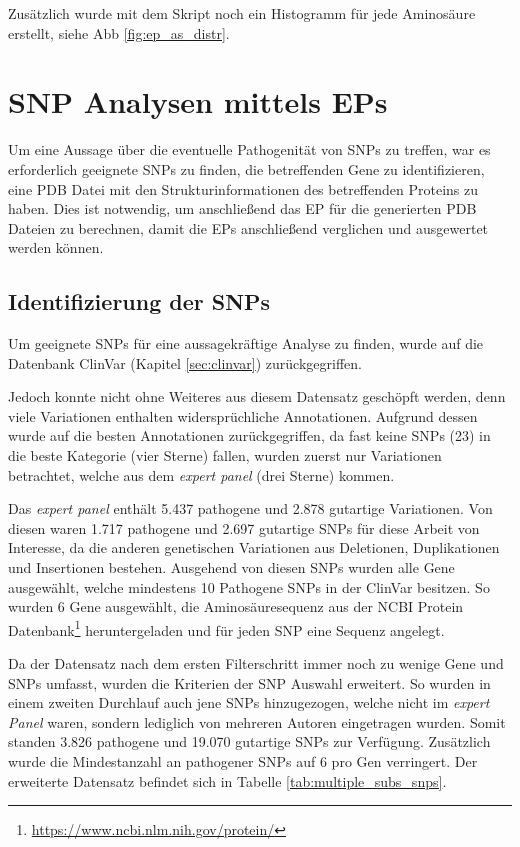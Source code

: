 Zusätzlich wurde mit dem Skript noch ein Histogramm für jede Aminosäure erstellt, siehe \ac{Abb} \ref{fig:ep_as_distr}.



\section{SNP Analysen mittels EPs}
\label{sec:snp_analyse}

Um eine Aussage über die eventuelle Pathogenität von \ac{SNP}s zu treffen, war es erforderlich geeignete \ac{SNP}s zu finden, die betreffenden Gene zu identifizieren, eine \ac{PDB} Datei mit den Strukturinformationen des betreffenden Proteins zu haben. Dies ist notwendig, um anschließend das \ac{EP} für die generierten \ac{PDB} Dateien zu berechnen, damit die \ac{EP}s anschließend verglichen und ausgewertet werden können.


\subsection{Identifizierung der SNPs}
\label{sec:clinvar_filter}
Um geeignete \ac{SNP}s für eine aussagekräftige Analyse zu finden, wurde auf die Datenbank ClinVar (Kapitel \ref{sec:clinvar}) zurückgegriffen.

Jedoch konnte nicht ohne Weiteres aus diesem Datensatz geschöpft werden, denn viele Variationen enthalten widersprüchliche Annotationen. Aufgrund dessen wurde auf die besten Annotationen zurückgegriffen, da fast keine \ac{SNP}s (23) in die beste Kategorie (vier Sterne) fallen, wurden zuerst nur Variationen betrachtet, welche aus dem \emph{expert panel} (drei Sterne) kommen. 

Das \emph{expert panel} enthält 5.437 pathogene und 2.878 gutartige Variationen. Von diesen waren 1.717 pathogene und 2.697 gutartige \ac{SNP}s für diese Arbeit von Interesse, da die anderen genetischen Variationen aus Deletionen, Duplikationen und Insertionen bestehen. Ausgehend von diesen \ac{SNP}s wurden alle Gene ausgewählt, welche mindestens 10 Pathogene \ac{SNP}s in der ClinVar besitzen. So wurden 6 Gene ausgewählt, die Aminosäuresequenz aus der NCBI Protein Datenbank\footnote{\url{https://www.ncbi.nlm.nih.gov/protein/}} heruntergeladen und für jeden \ac{SNP} eine Sequenz angelegt. 

Da der Datensatz nach dem ersten Filterschritt immer noch zu wenige Gene und \ac{SNP}s umfasst, wurden die Kriterien der \ac{SNP} Auswahl erweitert. So wurden in einem zweiten Durchlauf auch jene \ac{SNP}s hinzugezogen, welche nicht im \emph{expert Panel} waren, sondern lediglich von mehreren Autoren eingetragen wurden. Somit standen 3.826 pathogene und 19.070 gutartige \ac{SNP}s zur Verfügung. Zusätzlich wurde die Mindestanzahl an pathogener SNPs auf 6 pro Gen verringert. Der erweiterte Datensatz befindet sich in Tabelle \ref{tab:multiple_subs_snps}.


